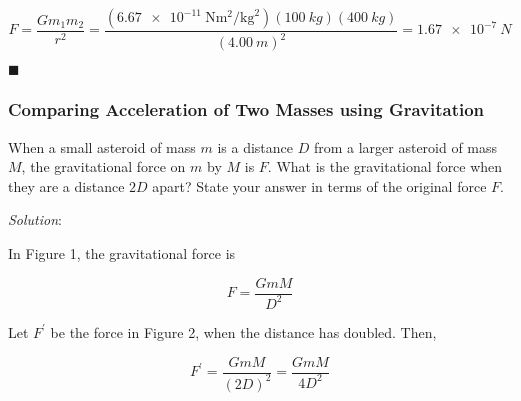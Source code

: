 \documentclass[dvipsnames]{article}
\begin{document}
\begin{equation*}
    F = \frac{G m_1 m_2}{r^2} = 
    \frac{\left(\SI[per-mode=fraction]{6.67e-11}{\newton\meter\tothe{2}\per\kilogram\tothe{2}}\right) (\SI{100}{kg}) (\SI{400}{kg})}{\left(\SI{4.00}{m}\right)^2} = 
    \boxed{\SI{1.67e-7}{N}}
\end{equation*}

\hfill $\blacksquare$



\subsubsection{Comparing Acceleration of Two Masses using Gravitation}

\begin{example}
When a small asteroid of mass $m$ is a distance $D$ from a larger asteroid of mass $M$, the gravitational force on $m$ by $M$ is $F$. What is the gravitational force when they are a distance $2D$ apart? State your answer in terms of the original force $F$.

\begin{center}
\hspace{1.5cm}
\end{center}
\end{example}

\textit{Solution}:

In Figure 1, the gravitational force is

\begin{equation*}
    F = \frac{GmM}{D^2}
\end{equation*}

Let $F^\prime$ be the force in Figure 2, when the distance has doubled. Then,

\begin{equation*}
    F^\prime = \frac{G m M}{(2D)^2} = \frac{GmM}{4D^2}
\end{equation*}
\end{document}

